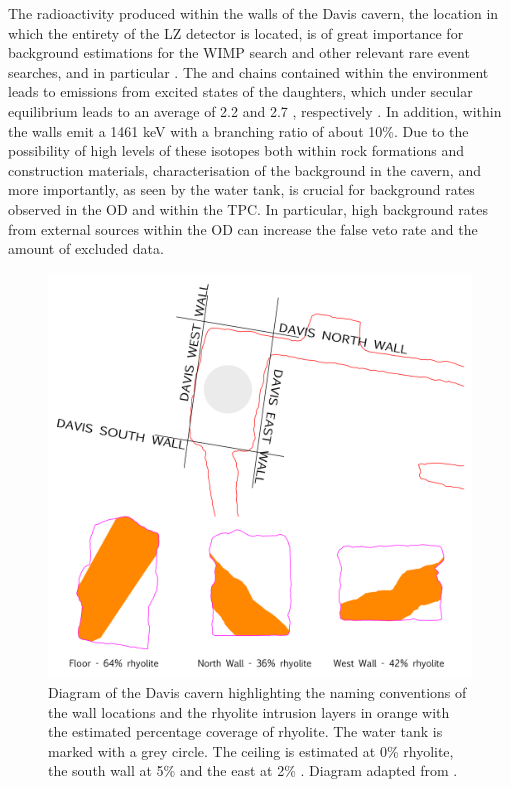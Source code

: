 The radioactivity produced within the walls of the Davis cavern, the location in which the entirety of the LZ detector is located, is of great importance for background estimations for the WIMP search and other relevant rare event searches, and in particular \neutrinolessDoubleBeta{}. The \UTTE{} and \ThTTT{} chains contained within the environment leads to \gray{} emissions from excited states of the daughters, which under secular equilibrium leads to an average of 2.2 and 2.7 \grays{}, respectively \cite{MolnarGabor.1997}. In addition, \KFZ{} within the walls emit a 1461 keV \gray{} with a branching ratio of about 10\%. Due to the possibility of high levels of these isotopes both within rock formations and construction materials, characterisation of the \gray{} background in the cavern, and more importantly, as seen by the water tank, is crucial for background rates observed in the OD and within the TPC. In particular, high background rates from external sources within the OD can increase the false veto rate and the amount of excluded data. 
%
\begin{figure}[b!]
    \centering
    \includegraphics[scale=0.80]{Chapter_3/Figures/Davis_cavern_rhyolite.png}
    \caption[Schematic of the Davis cavern, showing the rhyolite intrusion layers and the position of the water tank with naming conventions.]
    {Diagram of the Davis cavern highlighting the naming conventions of the wall locations and the rhyolite intrusion layers in orange with the estimated percentage coverage of rhyolite. The water tank is marked with a grey circle. The ceiling is estimated at 0\% rhyolite, the south wall at 5\% and the east at 2\% \cite{Heise_2015}. Diagram adapted from \cite{Akerib_2020_gray_measurements}.}
    \label{fig:davis_cavern_walls}
\end{figure}
%

